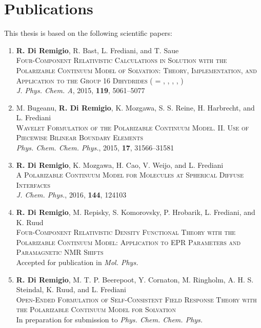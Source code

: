 \thispagestyle{empty}
{}

\chapter*{Publications}

This thesis is based on the following scientific papers:

\begin{enumerate}[label=\textbf{\Roman{*} }, ref=\Roman{*}]

\item
  \textbf{R. Di Remigio}, R. Bast, L. Frediani, and T. Saue
  \\
  \textsc{
  Four-Component Relativistic Calculations in Solution with the
  Polarizable Continuum Model of Solvation: Theory,
  Implementation, and Application to the Group 16 Dihydrides
   ( = , , , ,
  )
  }
  \\
\textit{J. Phys. Chem. A}, \textrm{2015}, \textbf{119}, 5061--5077
\label{relapcm}

\item
  M. Bugeanu, \textbf{R. Di Remigio}, K. Mozgawa, S. S. Reine, H.
  Harbrecht,  and L. Frediani
  \\
  \textsc{
  Wavelet Formulation of the Polarizable Continuum Model. II. Use of
  Piecewise Bilinear Boundary Elements
  }
  \\
  \textit{Phys. Chem. Chem. Phys.}, \textrm{2015}, \textbf{17},
  31566--31581
\label{wemlin}

\item
  \textbf{R. Di Remigio}, K. Mozgawa, H. Cao, V. Weijo, and L.
  Frediani
  \\
  \textsc{
  A Polarizable Continuum Model for Molecules at Spherical
  Diffuse Interfaces
  }
  \\
  \textit{J. Chem. Phys.}, \textrm{2016}, \textbf{144}, 124103
\label{spherical}

\item
  \textbf{R. Di Remigio}, M. Repisky, S. Komorovsky, P. Hrobarik, L.
  Frediani, and K. Ruud
  \\
  \textsc{
  Four-Component Relativistic Density Functional Theory with the
  Polarizable Continuum Model: Application to EPR Parameters
  and Paramagnetic NMR Shifts
  }
  \\
  Accepted for publication in \textit{Mol. Phys.}
\label{pcmepr}

\item
  \textbf{R. Di Remigio}, M. T. P. Beerepoot, Y. Cornaton, M. Ringholm,
  A. H. S. Steindal, K. Ruud, and L. Frediani
  \\
  \textsc{
  Open-Ended Formulation of Self-Consistent Field Response Theory with
  the Polarizable Continuum Model for Solvation
  }
  \\
  In preparation for submission to \textit{Phys. Chem. Chem. Phys.}
\label{pcmopenrsp}
\end{enumerate}

